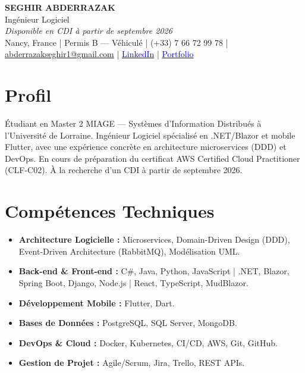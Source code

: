 \documentclass[10pt,a4paper]{article}
\begin{document}
\begin{center}
    {\fontsize{28}{34}\bfseries SEGHIR ABDERRAZAK} \\ \vspace{0.05cm}
    {\fontsize{16}{20}\selectfont Ingénieur Logiciel} \\ \vspace{0.05cm}
    {\fontsize{11}{14}\itshape Disponible en CDI à partir de septembre 2026} \\ \vspace{0.1cm}
    {\normalsize Nancy, France | Permis B — Véhiculé | (+33) 7 66 72 99 78 | \href{mailto:abderrazakseghir1@gmail.com}{abderrazakseghir1@gmail.com} | \href{https://www.linkedin.com/in/seghir-abderrazak-248520229/}{\textcolor{blue}{LinkedIn}} | \href{https://seghir-portfolio.vercel.app/}{\textcolor{blue}{Portfolio}}}
\end{center}

\vspace{0.2cm}

\section*{Profil}
\noindent Étudiant en Master 2 MIAGE — Systèmes d'Information Distribués à l'Université de Lorraine. Ingénieur Logiciel spécialisé en .NET/Blazor et mobile Flutter, avec une expérience concrète en architecture microservices (DDD) et DevOps. En cours de préparation du certificat AWS Certified Cloud Practitioner (CLF-C02). À la recherche d'un CDI à partir de septembre 2026.

\section*{Compétences Techniques}
\begin{itemize}[leftmargin=0.5cm, noitemsep, topsep=0pt, partopsep=0pt]
    \item \textbf{Architecture Logicielle :} Microservices, Domain-Driven Design (DDD), Event-Driven Architecture (RabbitMQ), Modélisation UML.
    \item \textbf{Back-end \& Front-end :} C\#, Java, Python, JavaScript | .NET, Blazor, Spring Boot, Django, Node.js | React, TypeScript, MudBlazor.
    \item \textbf{Développement Mobile :} Flutter, Dart.
    \item \textbf{Bases de Données :} PostgreSQL, SQL Server, MongoDB.
    \item \textbf{DevOps \& Cloud :} Docker, Kubernetes, CI/CD, AWS, Git, GitHub.
    \item \textbf{Gestion de Projet :} Agile/Scrum, Jira, Trello, REST APIs.
\end{itemize}
\end{document}

